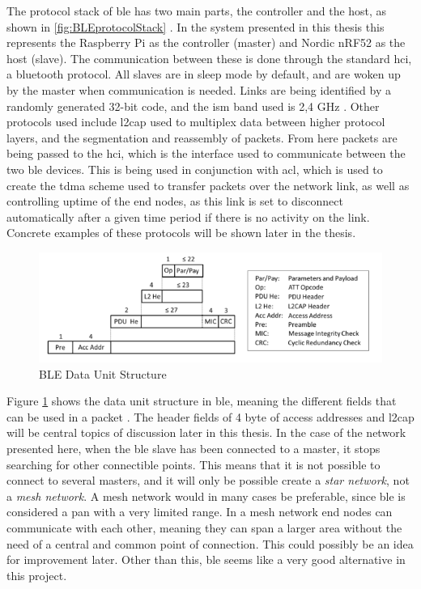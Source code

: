 The protocol stack of \gls{ble} has two main parts, the controller and the host, as shown in \ref{fig:BLEprotocolStack} \cite{gomez2012overview}. In the system presented in this thesis this represents the Raspberry Pi as the controller (master) and Nordic nRF52 as the host (slave). The communication between these is done through the standard \gls{hci}, a bluetooth protocol. All slaves are in sleep mode by default, and are woken up by the master when communication is needed. Links are being identified by a randomly generated 32-bit code, and the \gls{ism} band used is 2,4 GHz \cite{gomez2012overview}. Other protocols used include \gls{l2cap} used to multiplex data between higher protocol layers, and the segmentation and reassembly of packets. From here packets are being passed to the \gls{hci}, which is the interface used to communicate between the two \gls{ble} devices. This is being used in conjunction with \gls{acl}, which is used to create the \gls{tdma} scheme used to transfer packets over the network link, as well as controlling uptime of the end nodes, as this link is set to disconnect automatically after a given time period if there is no activity on the link. Concrete examples of these protocols will be shown later in the thesis. 



\begin{figure}[ht]
    \centering
    \includegraphics[scale=0.7]{BLEdataUnitStructure.png}    
    \caption{BLE Data Unit Structure}
    \label{fig:BLEdataUnitStructure}
\end{figure}

Figure \ref{fig:BLEdataUnitStructure} shows the data unit structure in \gls{ble}, meaning the different fields that can be used in a packet \cite{gomez2012overview}. The header fields of 4 \gls{byte} of access addresses and \gls{l2cap} will be central topics of discussion later in this thesis. In the case of the network presented here, when the \gls{ble} slave has been connected to a master, it stops searching for other connectible points. This means that it is not possible to connect to several masters, and it will only be possible create a \textit{star network}, not a \textit{mesh network}. A mesh network would in many cases be preferable, since \gls{ble} is considered a \gls{pan} with a very limited range. In a mesh network end nodes can communicate with each other, meaning they can span a larger area without the need of a central and common point of connection. This could possibly be an idea for improvement later. Other than this, \gls{ble} seems like a very good alternative in this project. 

